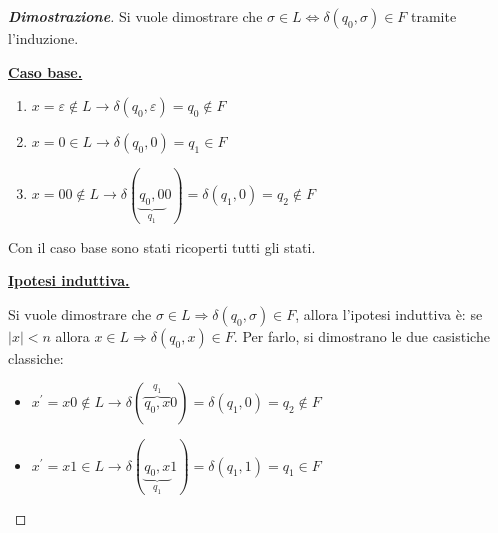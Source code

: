 \documentclass[a4paper]{article}
\begin{document}
	\newpage
	
	\begin{proof}[\textcolor{Blue3}{\textbf{Dimostrazione}}]
		Si vuole dimostrare che $\sigma \in L \iff \delta\left(q_{0}, \sigma\right) \in F$ tramite l'induzione.\newline
		
		\noindent
		\textbf{\underline{Caso base.}}
		
		\begin{enumerate}
			\item $x = \varepsilon \notin L \longrightarrow \delta\left(q_{0}, \varepsilon\right) = q_{0} \notin F$
			\item $x = 0 \in L \longrightarrow \delta\left(q_{0}, 0\right) = q_{1} \in F$
			\item $x = 00 \notin L \longrightarrow \delta(\underbrace{q_{0}, 0}_{q_{1}} 0) = \delta\left(q_{1}, 0\right) = q_{2} \notin F$
		\end{enumerate}
		
		\noindent
		Con il caso base sono stati ricoperti tutti gli stati.\newline
		
		\noindent
		\textbf{\underline{Ipotesi induttiva.}}\newline
		
		\noindent
		Si vuole dimostrare che $\sigma \in L \Longrightarrow \delta\left(q_{0}, \sigma\right) \in F$, allora l'ipotesi induttiva è: se $|x| < n$ allora $x \in L \Longrightarrow \delta\left(q_{0}, x\right) \in F$. Per farlo, si dimostrano le due casistiche classiche:
		
		\begin{itemize}
			\item $x^{'} = x0 \notin L \longrightarrow \delta(\overbrace{q_{0}, x}^{q_{1}} 0) = \delta\left(q_{1}, 0\right) = q_{2} \notin F$
			
			\item $x^{'} = x1 \in L \longrightarrow \delta(\underbrace{q_{0}, x}_{q_{1}} 1) = \delta\left(q_{1}, 1\right) = q_{1} \in F$
		\end{itemize}
	\end{proof}

	\newpage
\end{document}
